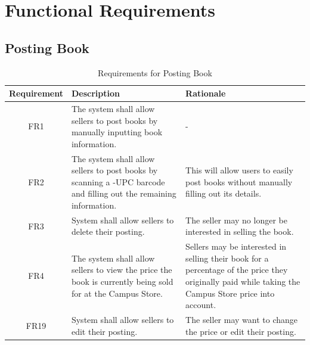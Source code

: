 \documentclass[fullpage]{article}
\begin{document}
\section{Functional Requirements}

\subsection{Posting Book}
\begin{table}[h!]
\flushleft
\begin{tabular}{|c|p{6cm}|p{6cm}|}
\hline
 \rowcolor{lightgray}
\textbf{Requirement} & \textbf{Description} & \textbf{Rationale} \\
\hline
FR1 &The system shall allow sellers to post books by manually inputting book information.& -\\
\hline
FR2&The system shall allow sellers to post books by scanning a -UPC barcode and filling out the remaining information. & This will allow users to easily post books without manually filling out its details.\\
\hline
FR3 & System shall allow sellers to delete their posting.& The seller may no longer be interested in selling the book.\\
\hline
FR4 &  The system shall allow sellers to view the price the book is currently being sold for at the Campus Store. & Sellers may be interested in selling their book for a percentage of the price they originally paid while taking the Campus Store price into account.\\
\hline
FR19 & System shall allow sellers to edit their posting.& The seller may want to change the price or edit their posting.\\
\hline
\end{tabular}
\caption{Requirements for Posting Book}
\end{table}

\newpage
\end{document}
